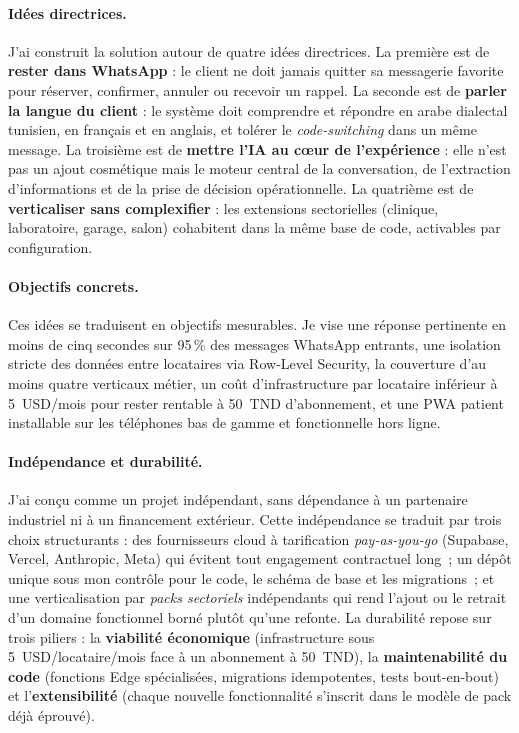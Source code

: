 \paragraph{Idées directrices.}
J'ai construit la solution autour de quatre idées directrices. La
première est de \textbf{rester dans WhatsApp} : le client ne doit
jamais quitter sa messagerie favorite pour réserver, confirmer,
annuler ou recevoir un rappel. La seconde est de \textbf{parler la
langue du client} : le système doit comprendre et répondre en arabe
dialectal tunisien, en français et en anglais, et tolérer le
\emph{code-switching} dans un même message. La troisième est de
\textbf{mettre l'IA au cœur de l'expérience} : elle n'est pas un
ajout cosmétique mais le moteur central de la conversation, de
l'extraction d'informations et de la prise de décision
opérationnelle. La quatrième est de \textbf{verticaliser sans
complexifier} : les extensions sectorielles (clinique, laboratoire,
garage, salon) cohabitent dans la même base de code, activables par
configuration.

\paragraph{Objectifs concrets.}
Ces idées se traduisent en objectifs mesurables. Je vise une
réponse pertinente en moins de cinq secondes sur 95\,\% des
messages WhatsApp entrants, une isolation stricte des données entre
locataires via Row-Level Security, la couverture d'au moins quatre
verticaux métier, un coût d'infrastructure par locataire inférieur
à 5~USD/mois pour rester rentable à 50~TND d'abonnement, et une
PWA patient installable sur les téléphones bas de gamme et
fonctionnelle hors ligne.

\paragraph{Indépendance et durabilité.}
J'ai conçu \nova{} comme un projet indépendant, sans dépendance à
un partenaire industriel ni à un financement extérieur. Cette
indépendance se traduit par trois choix structurants : des
fournisseurs cloud à tarification \emph{pay-as-you-go} (Supabase,
Vercel, Anthropic, Meta) qui évitent tout engagement contractuel
long~; un dépôt unique sous mon contrôle pour le code, le schéma de
base et les migrations~; et une verticalisation par
\emph{packs sectoriels} indépendants qui rend l'ajout ou le retrait
d'un domaine fonctionnel borné plutôt qu'une refonte. La durabilité
repose sur trois piliers : la \textbf{viabilité économique}
(infrastructure sous 5~USD/locataire/mois face à un abonnement à
50~TND), la \textbf{maintenabilité du code} (fonctions Edge
spécialisées, migrations idempotentes, tests bout-en-bout) et
l'\textbf{extensibilité} (chaque nouvelle fonctionnalité s'inscrit
dans le modèle de pack déjà éprouvé).


